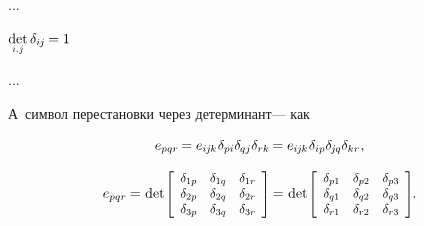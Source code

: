 \begin{otherlanguage}{russian}
...

${
\underset{\raisebox{.12em}{\scalebox{0.7}{$i$,$\hspace{.15ex}j$}}}{\operatorname{det}} \hspace{.4ex} \delta_{i\hspace{-0.1ex}j} \hspace{-0.16ex} = 1
}$

...

\vspace{-0.2em}
А~символ перестановки через детерминант\:--- как

\nopagebreak\vspace{-0.2em}\begin{equation*}
e_{pqr} \hspace{-0.2ex}
= e_{i\hspace{-0.1ex}j\hspace{-0.1ex}k} \hspace{.1ex} \delta_{pi} \delta_{\hspace{-0.1ex}qj} \delta_{rk} \hspace{-0.2ex}
= e_{i\hspace{-0.1ex}j\hspace{-0.1ex}k} \hspace{.1ex} \delta_{ip} \delta_{\hspace{-0.15ex}j\hspace{-0.1ex}q} \delta_{kr}
\hspace{.1ex} ,
\end{equation*}

\nopagebreak\vspace{-0.1em}\begin{equation}\label{permutationsymbolasdeterminant}
e_{pqr} \hspace{-0.1ex}
= \hspace{.1ex}
\operatorname{det}\hspace{-0.25ex} \scalebox{0.92}{$\left[ \begin{array}{ccc}
\delta_{1p} & \delta_{1q} & \delta_{1r} \\
\delta_{2p} & \delta_{2q} & \delta_{2r} \\
\delta_{3p} & \delta_{3q} & \delta_{3r}
\end{array} \hspace{-0.1ex} \right]$} \hspace{-0.2ex}
= \hspace{.1ex}
\operatorname{det}\hspace{-0.25ex} \scalebox{0.92}{$\left[ \begin{array}{ccc}
\delta_{p1} & \delta_{p2} & \delta_{p3} \\
\delta_{q1} & \delta_{q2} & \delta_{q3} \\
\delta_{r1} & \delta_{r2} & \delta_{r3}
\end{array} \hspace{-0.1ex} \right]$}
\hspace{-0.2ex} .
\end{equation}




\end{otherlanguage}
